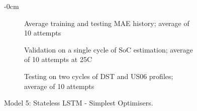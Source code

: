 \begin{figure}[H]
\begin{adjustwidth}{-\extralength}{0cm}
\begin{subfigure}[b]{0.425\textwidth}
        \caption{Average training and testing MAE history; average of 10 attempts}
    \end{subfigure}
    \hfill
    \begin{subfigure}[b]{0.425\textwidth}
        \centering
        
        \caption{Validation on a single cycle of SoC estimation; average of 10 attempts at 25\textdegree{}C}
    \end{subfigure}
    \hfill
    \begin{subfigure}[b]{0.425\textwidth}
        \centering
        
        \caption{Testing on two cycles of DST and US06 profiles; average of 10 attempts}
    \end{subfigure}
    \caption{Model 5: Stateless LSTM - Simplest Optimisers.}
    \label{fig:Model-5res}
    \end{adjustwidth}
\end{figure}
\clearpage